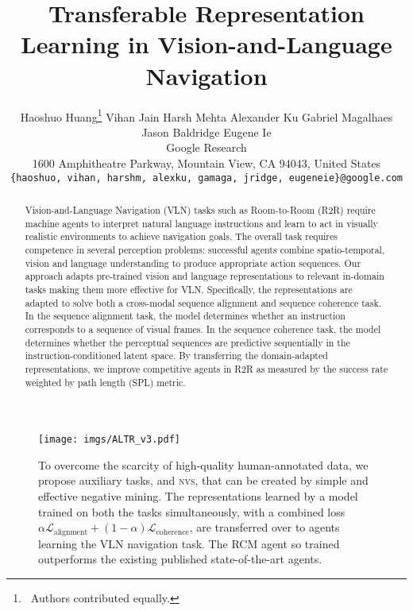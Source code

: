 \documentclass[10pt,twocolumn,letterpaper]{article}
\newcommand{\tasknvs}{\textsc{nvs}}
\begin{document}
\title{Transferable Representation Learning in Vision-and-Language Navigation}

\author{Haoshuo Huang\thanks{\ Authors contributed equally.} \qquad Vihan Jain \footnotemark[\value{footnote}] \qquad Harsh Mehta \qquad Alexander Ku \qquad Gabriel Magalhaes \\ Jason Baldridge \qquad Eugene Ie\\
Google Research\\
1600 Amphitheatre Parkway, Mountain View, CA 94043, United States\\
{\tt\small \{haoshuo, vihan, harshm, alexku, gamaga, jridge, eugeneie\}@google.com}
}

\maketitle
\ificcvfinal\thispagestyle{empty}\fi


\begin{abstract}
Vision-and-Language Navigation (VLN) tasks such as Room-to-Room (R2R) require machine agents to interpret natural language instructions and learn to act in visually realistic environments to achieve navigation goals. The overall task requires competence in several perception problems: successful agents combine spatio-temporal, vision and language understanding to produce appropriate action sequences. Our approach adapts pre-trained vision and language representations to relevant in-domain tasks making them more effective for VLN. Specifically, the representations are adapted to solve both a cross-modal sequence alignment and sequence coherence task. In the sequence alignment task, the model determines whether an instruction corresponds to a sequence of visual frames. In the sequence coherence task, the model determines whether the perceptual sequences are predictive sequentially in the instruction-conditioned latent space. By transferring the domain-adapted representations, we improve competitive agents in R2R as measured by the success rate weighted by path length (SPL) metric.
\end{abstract}


\begin{figure}
  \centering   
  \texttt{[image: imgs/ALTR\_v3.pdf]}


\caption{ 
    To overcome the scarcity of high-quality human-annotated data, we propose auxiliary tasks, {\taskcma} and {\tasknvs}, that can be created by simple and effective negative mining. The representations learned by a model trained on both the tasks simultaneously, with a combined loss $\alpha \mathcal{L}_\text{alignment} + (1 - \alpha) \mathcal{L}_\text{coherence}$, are transferred over to agents learning the VLN navigation task. The RCM agent \cite{Wang:2018:RCM} so trained outperforms the existing published state-of-the-art agents.
    }
    \label{fig:intro_summary}
\end{figure}
\end{document}
